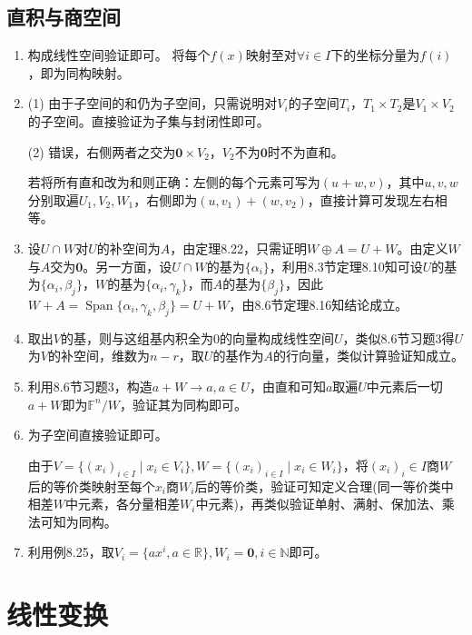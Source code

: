 \documentclass[a4paper,UTF8,fontset=windows]{ctexart}
\DeclareMathOperator{\Span}{Span}
\begin{document}
\subsection{直积与商空间}
\begin{enumerate}
\item
构成线性空间验证即可。
将每个$f(x)$映射至对$\forall i\in I$下的坐标分量为$f(i)$，即为同构映射。

\item
(1) 由于子空间的和仍为子空间，只需说明对$V_i$的子空间$T_i$，$T_1\times T_2$是$V_1\times V_2$的子空间。直接验证为子集与封闭性即可。

(2) 错误，右侧两者之交为$\mathbf{0}\times V_2$，$V_2$不为$\mathbf{0}$时不为直和。

若将所有直和改为和则正确：左侧的每个元素可写为$(u+w,v)$，其中$u,v,w$分别取遍$U_1,V_2,W_1$，右侧即为$(u,v_1)+(w,v_2)$，直接计算可发现左右相等。

\item
设$U\cap W$对$U$的补空间为$A$，由定理8.22，只需证明$W\oplus A=U+W$。由定义$W$与$A$交为$\mathbf{0}$。另一方面，设$U\cap W$的基为$\{\alpha_i\}$，利用8.3节定理8.10知可设$U$的基为$\{\alpha_i,\beta_j\}$，$W$的基为$\{\alpha_i,\gamma_k\}$，而$A$的基为$\{\beta_j\}$，因此$W+A=\Span\{\alpha_i,\gamma_k,\beta_j\}=U+W$，由8.6节定理8.16知结论成立。

\item
取出$V$的基，则与这组基内积全为0的向量构成线性空间$U$，类似8.6节习题3得$U$为$V$的补空间，维数为$n-r$，取$U$的基作为$A$的行向量，类似计算验证知成立。

\item
利用8.6节习题3，构造$a+W\to a,a\in U$，由直和可知$a$取遍$U$中元素后一切$a+W$即为$\mathbb{F}^n/W$，验证其为同构即可。

\item
为子空间直接验证即可。

由于$V=\{(x_i)_{i\in I}\mid x_i\in V_i\},W=\{(x_i)_{i\in I}\mid x_i\in W_i\}$，将$(x_i)_i\in I$商$W$后的等价类映射至每个$x_i$商$W_i$后的等价类，验证可知定义合理(同一等价类中相差$W$中元素，各分量相差$W_i$中元素)，再类似验证单射、满射、保加法、乘法可知为同构。

\item
利用例8.25，取$V_i=\{ax^i,a\in\mathbb{R}\},W_i=\mathbf{0},i\in\mathbb{N}$即可。
\end{enumerate}

\section{线性变换}
\end{document}
